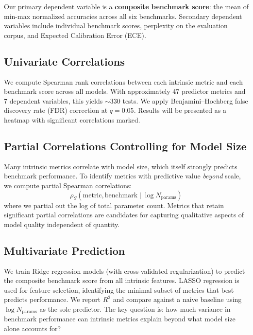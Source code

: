 \documentclass{article}
\begin{document}
Our primary dependent variable is a \textbf{composite benchmark score}: the mean of min-max normalized accuracies across all six benchmarks.
Secondary dependent variables include individual benchmark scores, perplexity on the evaluation corpus, and Expected Calibration Error (ECE).

\subsection{Univariate Correlations}
\label{sec:univariate}

We compute Spearman rank correlations between each intrinsic metric and each benchmark score across all models.
With approximately 47 predictor metrics and 7 dependent variables, this yields $\sim\!330$ tests.
We apply Benjamini--Hochberg false discovery rate (FDR) correction at $q = 0.05$.
Results will be presented as a heatmap with significant correlations marked.

\subsection{Partial Correlations Controlling for Model Size}
\label{sec:partial}

Many intrinsic metrics correlate with model size, which itself strongly predicts benchmark performance.
To identify metrics with predictive value \emph{beyond} scale, we compute partial Spearman correlations:
\begin{equation}
  \rho_S(\text{metric}, \text{benchmark} \mid \log N_{\text{params}})
\end{equation}
where we partial out the log of total parameter count.
Metrics that retain significant partial correlations are candidates for capturing qualitative aspects of model quality independent of quantity.

\subsection{Multivariate Prediction}
\label{sec:multivariate}

We train Ridge regression models (with cross-validated regularization) to predict the composite benchmark score from all intrinsic features.
LASSO regression is used for feature selection, identifying the minimal subset of metrics that best predicts performance.
We report $R^2$ and compare against a naive baseline using $\log N_{\text{params}}$ as the sole predictor.
The key question is: how much variance in benchmark performance can intrinsic metrics explain beyond what model size alone accounts for?
\end{document}
